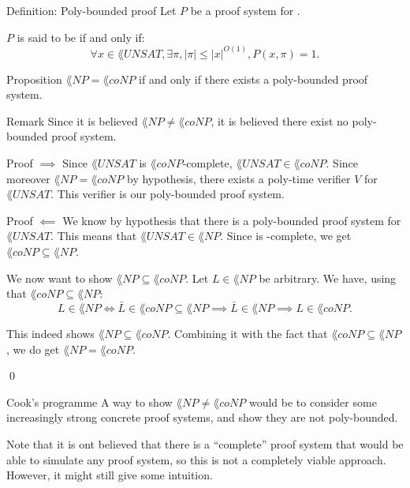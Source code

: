 \documentclass[a4paper]{article}
\begin{document}
\begin{parag}{Definition: Poly-bounded proof}
    Let $P$ be a proof system for . 

    $P$ is said to be  if and only if: 
    \[\forall x \in \lang{UNSAT}, \exists \pi, \left|\pi\right| \leq \left|x\right|^{O\left(1\right)}, P\left(x, \pi\right) = 1.\]
\end{parag}

\begin{parag}{Proposition}
    $\lang{NP} = \lang{coNP}$ if and only if there exists a poly-bounded proof system.

    \begin{subparag}{Remark}
        Since it is believed $\lang{NP} \neq \lang{coNP}$, it is believed there exist no poly-bounded proof system.
    \end{subparag}

    \begin{subparag}{Proof $\implies$}
        Since $\lang{UNSAT}$ is $\lang{coNP}$-complete, $\lang{UNSAT} \in \lang{coNP}$. Since moreover $\lang{NP} = \lang{coNP}$ by hypothesis, there exists a poly-time verifier $V$ for $\lang{UNSAT}$. This verifier is our poly-bounded proof system.
    \end{subparag}

    \begin{subparag}{Proof $\impliedby$}
        We know by hypothesis that there is a poly-bounded proof system for $\lang{UNSAT}$. This means that $\lang{UNSAT} \in \lang{NP}$. Since  is -complete, we get $\lang{coNP} \subseteq \lang{NP}$. 

        We now want to show $\lang{NP} \subseteq \lang{coNP}$. Let $L \in \lang{NP}$ be arbitrary. We have, using that $\lang{coNP} \subseteq \lang{NP}$: 
        \[L \in \lang{NP} \iff \bar{L} \in \lang{coNP} \subseteq \lang{NP} \implies \bar{L} \in \lang{NP} \implies L \in \lang{coNP}.\]
        
        This indeed shows $\lang{NP} \subseteq \lang{coNP}$. Combining it with the fact that $\lang{coNP} \subseteq \lang{NP}$, we do get $\lang{NP} = \lang{coNP}$.

        \qed
    \end{subparag}
\end{parag}

\begin{parag}{Cook's programme}
    A way to show $\lang{NP} \neq \lang{coNP}$ would be to consider some increasingly strong concrete proof systems, and show they are not poly-bounded.

    Note that it is ont believed that there is a ``complete'' proof system that would be able to simulate any proof system, so this is not a completely viable approach. However, it might still give some intuition.
\end{parag}
\end{document}
